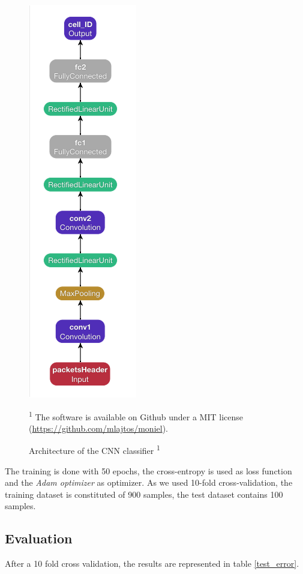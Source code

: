 \documentclass[10pt,conference,compsocconf]{IEEEtran}
\begin{document}
\begin{figure}
    \centering
    \includegraphics[scale=0.5]{model.png}
    \caption{Architecture of the CNN classifier \textsuperscript{1}}
    \small\textsuperscript{1} The software is available on Github under a MIT license (\url{https://github.com/mlajtos/moniel}).
    \label{model_arch}
\end{figure}
The training is done with 50 epochs, the cross-entropy is used as loss function and the \textit{Adam optimizer} as optimizer. As we used 10-fold cross-validation, the training dataset is constituted of 900 samples, the test dataset contains 100 samples.

\subsection{Evaluation}
After a 10 fold cross validation, the results are represented in table \ref{test_error}.
\end{document}
